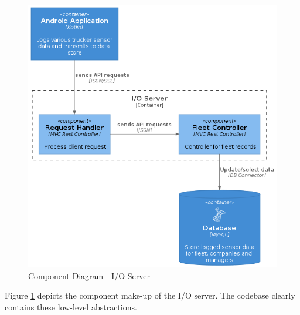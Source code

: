 \begin{figure}[H]
\centering
\includegraphics[width=6in]{IO_component.png}
\caption{Component Diagram - I/O Server}
\label{fig:IO_component}
\end{figure}

Figure \ref{fig:IO_component} depicts the component make-up of the I/O server.
The codebase clearly contains these low-level abstractions.

\pagebreak
